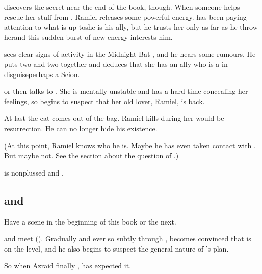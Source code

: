 \Secherdamon{} discovers the secret near the end of the book, though. 
When someone helps \Shiaraid{} rescue her stuff from \Redce, Ramiel releases some powerful energy. 
\Secherdamon{} has been paying attention to what \Shiaraid{} is up to\dash she is his ally, but he trusts her only as far as he throw her\dash and this sudden burst of new energy interests him. 

\Secherdamon{} sees clear signs of activity in the Midnight Bat \matrix, and he hears some rumours. 
He puts two and two together and deduces that she has an ally who is a \resphan{} in disguise\dash perhaps a Scion. 

\Secherdamon{} or \Vizsherioch{} then talks to \Shiaraid. 
She is mentally unstable and has a hard time concealing her feelings, so \Secherdamon{} begins to suspect that her old lover, Ramiel, is back. 

At last the cat comes out of the bag. 
Ramiel kills \Shiaraid{} during her would-be resurrection. 
He can no longer hide his existence. 

(At this point, Ramiel knows who he is. 
 Maybe he has even taken contact with \Cishiel{}. 
 But maybe not.
 See the section about the question of .) 

\Secherdamon{} is nonplussed and . 









\subsection{\Ishnaruchaefir and \Azraid}
Have a scene in the beginning of this book or the next.

\Ishnaruchaefir and \Azraid meet (). 
Gradually and ever so subtly through \SentinelsofMithEmph, \Ishnaruchaefir becomes convinced that \Azraid is on the level, and he also begins to suspect the general nature of \Azraid's plan. 

So when Azraid finally , \Ishnaruchaefir has expected it. 









